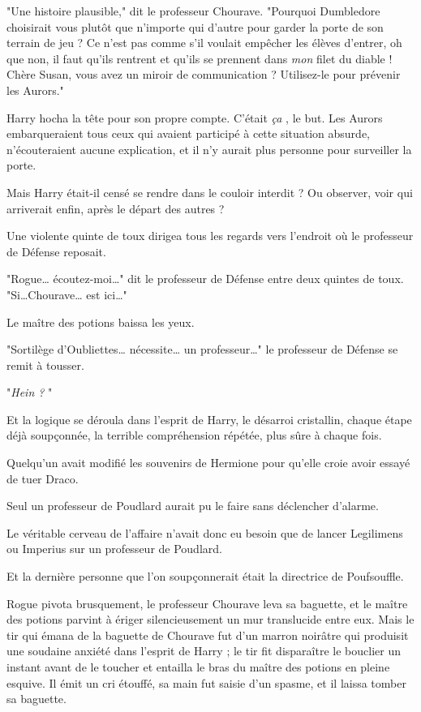 "Une histoire plausible," dit le professeur Chourave. "Pourquoi Dumbledore choisirait vous plutôt que n'importe qui d'autre pour garder la porte de son terrain de jeu ? Ce n'est pas comme s'il voulait empêcher les élèves d'entrer, oh que non, il faut qu'ils rentrent et qu'ils se prennent dans \emph{mon}  filet du diable ! Chère Susan, vous avez un miroir de communication ? Utilisez-le pour prévenir les Aurors."

Harry hocha la tête pour son propre compte. C'était \emph{ça} , le but. Les Aurors embarqueraient tous ceux qui avaient participé à cette situation absurde, n'écouteraient aucune explication, et il n'y aurait plus personne pour surveiller la porte.

Mais Harry était-il censé se rendre dans le couloir interdit ? Ou observer, voir qui arriverait enfin, après le départ des autres ?

Une violente quinte de toux dirigea tous les regards vers l'endroit où le professeur de Défense reposait.

"Rogue… écoutez-moi…" dit le professeur de Défense entre deux quintes de toux. "Si…Chourave… est ici…"

Le maître des potions baissa les yeux.

"Sortilège d'Oubliettes… nécessite… un professeur…" le professeur de Défense se remit à tousser.

"\emph{Hein ?} "

Et la logique se déroula dans l'esprit de Harry, le désarroi cristallin, chaque étape déjà soupçonnée, la terrible compréhension répétée, plus sûre à chaque fois.

Quelqu'un avait modifié les souvenirs de Hermione pour qu'elle croie avoir essayé de tuer Draco.

Seul un professeur de Poudlard aurait pu le faire sans déclencher d'alarme.

Le véritable cerveau de l'affaire n'avait donc eu besoin que de lancer Legilimens ou Imperius sur un professeur de Poudlard.

Et la dernière personne que l'on soupçonnerait était la directrice de Poufsouffle.

Rogue pivota brusquement, le professeur Chourave leva sa baguette, et le maître des potions parvint à ériger silencieusement un mur translucide entre eux. Mais le tir qui émana de la baguette de Chourave fut d'un marron noirâtre qui produisit une soudaine anxiété dans l'esprit de Harry ; le tir fit disparaître le bouclier un instant avant de le toucher et entailla le bras du maître des potions en pleine esquive. Il émit un cri étouffé, sa main fut saisie d'un spasme, et il laissa tomber sa baguette.

